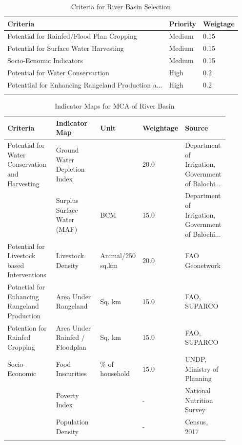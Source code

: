 \begin{longtable}[H]{| l | l | l |}
    \hline
    Criteria                                           & Priority & Weigtage \\
    \hline
    Potential for Rainfed/Flood Plan Cropping          & Medium   & 0.15     \\
    Potential for Surface Water Harvesting             & Medium   & 0.15     \\
    Socio-Ecnomic Indicators                           & Medium   & 0.15     \\
    Potential for Water Conservartion                  & High     & 0.2      \\
    Potenttial for Enhancing Rangeland Production a... & High     & 0.2      \\
    \hline

    \caption{Criteria for River Basin Selection}
    \label{table:RiverBasinCriteria}
\end{longtable}

\begin{longtable}{| p{0.25\linewidth} | p{0.25\linewidth} | p{0.1\linewidth} | p{0.1\linewidth} | p{0.2\linewidth} |  }
    \hline
    Criteria                                        & Indicator Map                  & Unit             & Weightage & Source                                             \\
    \hline
    Potential for Water Conservation and Harvesting & Ground Water Depletion Index   &                  & 20.0 & Department of Irrigation, Government of Balochi... \\
    & Surplus Surface Water (MAF)    & BCM              & 15.0      & Department of Irrigation, Government of Balochi... \\
    \hline
    Potential for Livestock based Interventions     & Livestock Density              & Animal/250 sq.km & 20.0 & FAO Geonetwork \\
    \hline
    Potnetial for Enhancing Rangeland Production    & Area Under Rangeland           & Sq. km           & 15.0      & FAO, SUPARCO                                       \\
    \hline
    Potention for Rainfed Cropping                  & Area Under Rainfed / Floodplan & Sq. km           & 15.0      & FAO, SUPARCO                                       \\
    \hline
    Socio-Economic                                  & Food Inscurities               & \% of household  & 15.0      & UNDP, Ministry of Planning                         \\
    & Poverty Index                  &                  & -         & National Nutrition Survey                          \\
    & Population Density             &                  & -         & Census, 2017                                       \\
    \hline
    \caption {Indicator Maps for MCA of River Basin}
    \label{table:RiverBasinIndicator}
\end{longtable}

